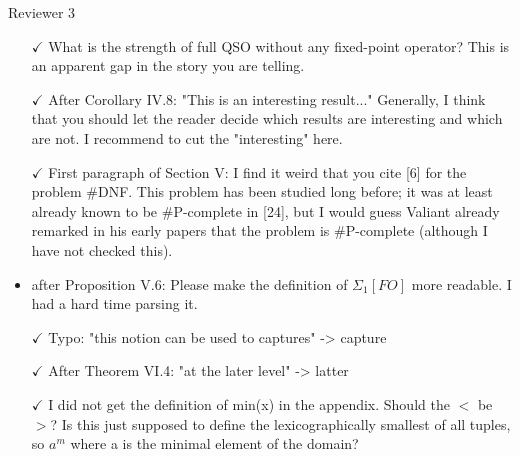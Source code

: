 Reviewer 3

\begin{itemize}
	
\item[$\checkmark$] What is the strength of full QSO without any fixed-point operator? This is an apparent gap in the story you are telling.
	
\item[$\checkmark$] After Corollary IV.8: "This is an interesting result..." Generally, I think that you should let the reader decide which results are interesting and which are not. I recommend to cut the "interesting" here.
	
\item[$\checkmark$] First paragraph of Section V: I find it weird that you cite [6] for the problem \#DNF. This problem has been studied long before; it was at least already known to be \#P-complete in [24], but I would guess Valiant already remarked in his early papers that the problem is \#P-complete (although I have not checked this).
	
\item after Proposition V.6: Please make the definition of $\Sigma_1[FO]$ more readable. I had a hard time parsing it.
	
\item[$\checkmark$] Typo: "this notion can be used to captures" -> capture
	
\item[$\checkmark$] After Theorem VI.4: "at the later level" -> latter
	
\item[$\checkmark$] I did not get the definition of min(x) in the appendix. Should the $<$ be $>$? Is this just supposed to define the lexicographically smallest of all tuples, so $a^m$ where a is the minimal element of the domain?
	
\end{itemize}

